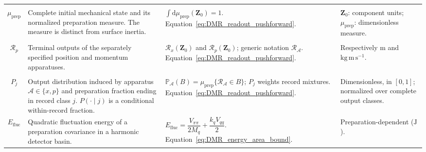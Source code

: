 \begin{longtable}{@{} c p{5.5cm} p{4cm} p{3.5cm} @{}}
\begin{tabular}[c]{@{}c@{}}$\mathbf Z_0$ \\ $\mu_{\mathrm{prep}}$\end{tabular} & {\raggedright Complete initial mechanical state and its normalized preparation measure. The measure is distinct from surface inertia.\par} & {\raggedright $\int\mathrm d\mu_{\mathrm{prep}}(\mathbf Z_0)=1$. \newline Equation~\eqref{eq:DMR_readout_pushforward}.\par} & {\raggedright $\mathbf Z_0$: component units; $\mu_{\mathrm{prep}}$: dimensionless measure.\par} \\

\begin{tabular}[c]{@{}c@{}}$\mathcal R_x$ \\ $\mathcal R_p$\end{tabular} & {\raggedright Terminal outputs of the separately specified position and momentum apparatuses.\par} & {\raggedright $\mathcal R_x(\mathbf Z_0)$ and $\mathcal R_p(\mathbf Z_0)$; generic notation $\mathcal R_{\mathcal A}$. \newline Equation~\eqref{eq:DMR_readout_pushforward}.\par} & {\raggedright Respectively $\mathrm m$ and $\mathrm{kg\,m\,s^{-1}}$.\par} \\

\begin{tabular}[c]{@{}c@{}}$\mathbb P_{\mathcal A}$ \\ $P_j$\end{tabular} & {\raggedright Output distribution induced by apparatus $\mathcal A\in\{x,p\}$ and preparation fraction ending in record class $j$. $P(\cdot\mid j)$ is a conditional within-record fraction.\par} & {\raggedright $\mathbb P_{\mathcal A}(B)=\mu_{\mathrm{prep}}\{\mathcal R_{\mathcal A}\in B\}$; $P_j$ weights record mixtures. \newline Equation~\eqref{eq:DMR_readout_pushforward}.\par} & {\raggedright Dimensionless, in $[0,1]$; normalized over complete output classes.\par} \\

$E_{\mathrm{fluc}}$ & {\raggedright Quadratic fluctuation energy of a preparation covariance in a harmonic detector basin.\par} & {\raggedright $E_{\mathrm{fluc}}=\dfrac{V_{\pi\pi}}{2M_q}+\dfrac{k_qV_{qq}}2$. \newline Equation~\eqref{eq:DMR_energy_area_bound}.\par} & {\raggedright Preparation-dependent ($\mathrm J$).\par} \\

\bottomrule
\end{longtable}

